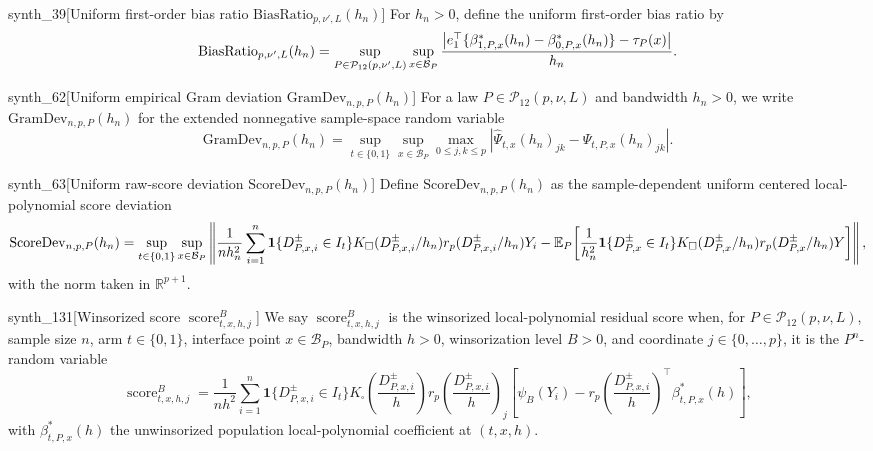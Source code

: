 \documentclass[11pt]{article}
\begin{document}
\begin{definitionv}{synth_39}[Uniform first-order bias ratio $\mathrm{BiasRatio}_{p,\nu',L}(h_n)$]
For $h_n>0$, define the uniform first-order bias ratio by \[ \mathrm{BiasRatio}_{p,\nu',L}(h_n)=\sup_{P\in\mathcal P_{12}(p,\nu',L)}\sup_{x\in\mathcal B_P}{\left|e_1^\top\{\beta^*_{1,P,x}(h_n)-\beta^*_{0,P,x}(h_n)\}-\tau_P(x)\right|\over h_n}. \]
\end{definitionv}

\begin{definitionv}{synth_62}[Uniform empirical Gram deviation \(\mathrm{GramDev}_{n,p,P}(h_n)\)]
For a law \(P\in\mathcal P_{12}(p,\nu,L)\) and bandwidth \(h_n>0\), we write \(\mathrm{GramDev}_{n,p,P}(h_n)\) for the extended nonnegative sample-space random variable\[\mathrm{GramDev}_{n,p,P}(h_n)=\sup_{t\in\{0,1\}}\sup_{x\in\mathcal B_P}\max_{0\leq j,k\leq p}\left|\widehat\Psi_{t,x}(h_n)_{jk}-\Psi_{t,P,x}(h_n)_{jk}\right|.\]
\end{definitionv}

\begin{definitionv}{synth_63}[Uniform raw-score deviation $\mathrm{ScoreDev}_{n,p,P}(h_n)$]
Define $\mathrm{ScoreDev}_{n,p,P}(h_n)$ as the sample-dependent uniform centered local-polynomial score deviation
\[
\mathrm{ScoreDev}_{n,p,P}(h_n)
=
\sup_{t\in\{0,1\}}\sup_{x\in\mathcal B_P}
\left\|
{1\over n h_n^2}\sum_{i=1}^n
\mathbf 1\{D^{\pm}_{P,x,i}\in I_t\}K_\square(D^{\pm}_{P,x,i}/h_n)r_p(D^{\pm}_{P,x,i}/h_n)Y_i
-
\mathbb E_P\!\left[
{1\over h_n^2}\mathbf 1\{D^{\pm}_{P,x}\in I_t\}K_\square(D^{\pm}_{P,x}/h_n)r_p(D^{\pm}_{P,x}/h_n)Y
\right]
\right\|,
\]
with the norm taken in $\mathbb R^{p+1}$.
\end{definitionv}

\begin{definitionv}{synth_131}[Winsorized score \(\operatorname{score}^{B}_{t,x,h,j}\)]
We say \(\operatorname{score}^{B}_{t,x,h,j}\) is the winsorized local-polynomial residual score when, for \(P\in\mathcal P_{12}(p,\nu,L)\), sample size \(n\), arm \(t\in\{0,1\}\), interface point \(x\in\mathcal B_P\), bandwidth \(h>0\), winsorization level \(B>0\), and coordinate \(j\in\{0,\ldots,p\}\), it is the \(P^n\)-random variable\[\operatorname{score}^{B}_{t,x,h,j}=\frac{1}{n h^2}\sum_{i=1}^n\mathbf 1\{D^{\pm}_{P,x,i}\in I_t\}K_\square\!\left(\frac{D^{\pm}_{P,x,i}}{h}\right)r_p\!\left(\frac{D^{\pm}_{P,x,i}}{h}\right)_j\left[\psi_B(Y_i)-r_p\!\left(\frac{D^{\pm}_{P,x,i}}{h}\right)^\top\beta^*_{t,P,x}(h)\right],\]with \(\beta^*_{t,P,x}(h)\) the unwinsorized population local-polynomial coefficient at \((t,x,h)\).
\end{definitionv}
\end{document}
